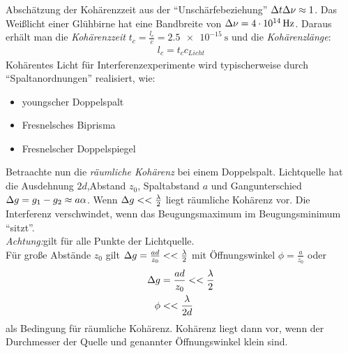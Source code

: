 Abschätzung der Kohärenzzeit aus der \enquote{Unschärfebeziehung} $\Delta t\Delta\nu\approx1$.
Das Weißlicht einer Glühbirne hat eine Bandbreite von $\Delta\nu=\SI{4e14}{\hertz}$. Daraus erhält man die \emph{Kohärenzzeit} $t_c=\frac{l_c}{c}=\SI{2,5e-15}{\second}$ und die \emph{Kohärenzlänge}:
\begin{align*}
	l_c=t_c c_{Licht}
\end{align*}
Kohärentes Licht für Interferenzexperimente wird typischerweise durch \enquote{Spaltanordnungen} realisiert, wie:
\begin{itemize}
	\item youngscher Doppelspalt
	\item Fresnelsches Biprisma
	\item Fresnelscher Doppelspiegel
\end{itemize}
Betraachte nun die \emph{räumliche Kohärenz} bei einem Doppelspalt.
Lichtquelle hat die Ausdehnung $2d$,Abstand $z_0$, Spaltabstand $a$ und Gangunterschied $\Delta g=g_1-g_2\approx a\alpha$.
Wenn $\Delta g<<\frac{\lambda}{2}$ liegt räumliche Kohärenz vor. Die Interferenz verschwindet, wenn das Beugungsmaximum im Beugungsminimum \enquote{sitzt}.\\
\emph{Achtung:}gilt für alle Punkte der Lichtquelle.\\
Für große Abstände $z_0$ gilt $\Delta g=\frac{ad}{z_0}<<\frac{\lambda}{2}$ mit Öffnungswinkel $\phi=\frac{a}{z_0}$ oder
\begin{align*}
	\Delta g &=\frac{ad}{z_0}<<\frac{\lambda}{2}\\
	\phi &<<\frac{\lambda}{2d}
\end{align*}
als Bedingung für räumliche Kohärenz. Kohärenz liegt dann vor, wenn der Durchmesser der Quelle und genannter Öffnungswinkel klein sind.
